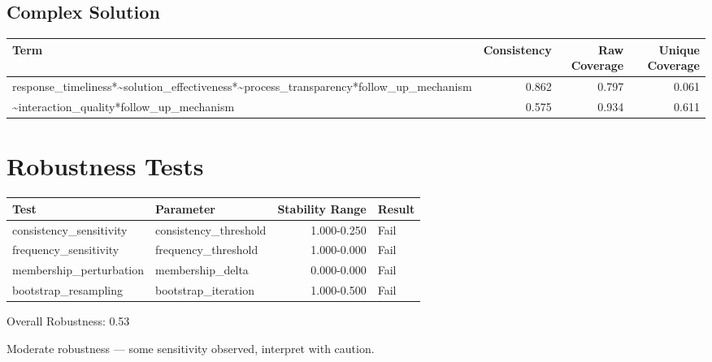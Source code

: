\documentclass[12pt,a4paper]{article}
\begin{document}
\subsection{Complex Solution}

\begin{tabular}{lrrr}
\toprule
Term & Consistency & Raw Coverage & Unique Coverage \\
\midrule

    response\_timeliness*\textasciitilde{}solution\_effectiveness*\textasciitilde{}process\_transparency*follow\_up\_mechanism & 0.862 & 0.797 & 0.061 \\
    \textasciitilde{}interaction\_quality*follow\_up\_mechanism & 0.575 & 0.934 & 0.611 \\

\bottomrule
\end{tabular}


\section{Robustness Tests}
\begin{tabular}{llrl}
\toprule
Test & Parameter & Stability Range & Result \\
\midrule
    consistency\_sensitivity & consistency\_threshold & 1.000-0.250 & Fail \\
    frequency\_sensitivity & frequency\_threshold & 1.000-0.000 & Fail \\
    membership\_perturbation & membership\_delta & 0.000-0.000 & Fail \\
    bootstrap\_resampling & bootstrap\_iteration & 1.000-0.500 & Fail \\
\bottomrule
\end{tabular}

Overall Robustness: 0.53

Moderate robustness — some sensitivity observed, interpret with caution.
\end{document}
